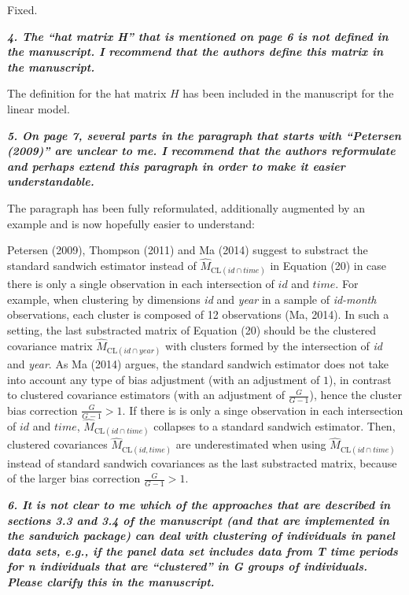 \documentclass[10pt,a4paper]{article}
\begin{document}
\medskip

Fixed.

\medskip

\textbf{\textit{4. The ``hat matrix H'' that is mentioned on page 6 is not defined in the manuscript. I
recommend that the authors define this matrix in the manuscript.}}

\medskip

The definition for the hat matrix $H$ has been included in the manuscript for the linear model.

\medskip

\textbf{\textit{5. On page 7, several parts in the paragraph that starts with ``Petersen (2009)'' are unclear
to me. I recommend that the authors reformulate and perhaps extend this paragraph in
order to make it easier understandable.}}

\medskip

The paragraph has been fully reformulated, additionally augmented by an example and is now hopefully easier to understand:

Petersen (2009), Thompson (2011) and Ma (2014)
suggest to substract the standard sandwich estimator instead of $\hat M_{\mathrm{CL}(id \cap time)}$ in Equation (20) in case there is only a single
observation in each intersection of $id$ and $time$.
For example, when clustering by dimensions \emph{id} and \emph{year} in a sample
of \emph{id-month} observations, each cluster is composed of 12 observations (Ma, 2014). In such a setting, the last substracted matrix of Equation (20) should be the clustered covariance matrix  $\hat M_{\mathrm{CL}(id \cap year)}$
with clusters formed by the intersection of \emph{id} and \emph{year}.
As Ma (2014) argues, the standard sandwich estimator does not take into
account any type of bias adjustment (with an adjustment of $1$), in contrast to clustered covariance estimators (with an adjustment of $\frac{G}{G-1}$), hence the cluster bias correction  $\frac{G}{G-1} > 1$. If there is is only a singe observation in each intersection of $id$ and $time$, $\hat M_{\mathrm{CL}(id \cap time)}$ collapses to a standard sandwich estimator. Then, clustered covariances $\hat M_{\mathrm{CL}(id,time)}$ are underestimated when using $\hat M_{\mathrm{CL}(id \cap time)}$ instead of standard sandwich covariances as the last substracted matrix, because of the larger bias correction $\frac{G}{G-1} > 1$.

\medskip

\textbf{\textit{6. It is not clear to me which of the approaches that are described in sections 3.3 and 3.4
of the manuscript (and that are implemented in the sandwich package) can deal with clustering of individuals in panel data sets, e.g., if the panel data set includes data from T time periods for n individuals that are ``clustered'' in G groups of individuals. Please clarify this in the manuscript.}}
\end{document}
